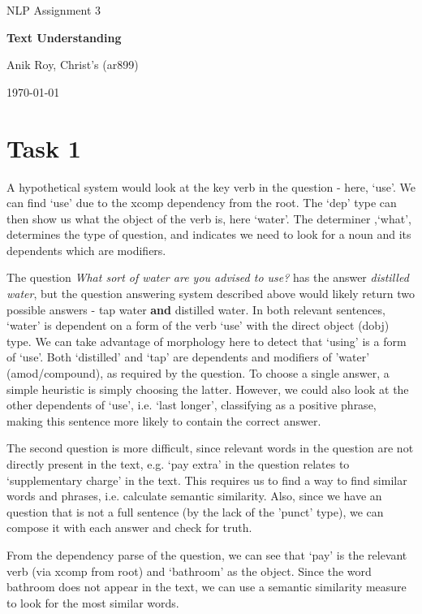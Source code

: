 \documentclass[12pt,a4paper]{article}
\begin{document}
\centerline{\large NLP Assignment 3}
\vspace{0.2in}
\centerline{\Large\bf Text Understanding}
\vspace{0.1in}
\centerline{\large {Anik Roy, Christ's (ar899)}}
\vspace{0.1in}
\centerline{\large {\today}}
\vspace{0.05in}


\section*{Task 1}


A hypothetical system would look at the key verb in the question - here, `use'. We can find `use' due to the xcomp dependency from the root. The `dep' type can then show us what the object of the verb is, here `water'. The determiner ,`what', determines the type of question, and indicates we need to look for a noun and its dependents which are modifiers.

The question \textit{What sort of water are you advised to use?} has the answer \textit{distilled water}, but the question answering system described above would likely return two possible answers - tap water \textbf{and} distilled water. In both relevant sentences, `water' is dependent on a form of the verb `use' with the direct object (dobj) type. We can take advantage of morphology \cite{NLP_lec2} here to detect that `using' is a form of `use'. Both `distilled' and `tap' are dependents and modifiers of 'water' (amod/compound), as required by the question. To choose a single answer, a simple heuristic is simply choosing the latter. However, we could also look at the other dependents of `use', i.e. `last longer', classifying as a positive phrase, making this sentence more likely to contain the correct answer. 

The second question is more difficult, since relevant words in the question are not directly present in the text, e.g. `pay extra' in the question relates to `supplementary charge' in the text. This requires us to find a way to find similar words and phrases, i.e. calculate semantic similarity. Also, since we have an question that is not a full sentence (by the lack of the 'punct' type), we can compose it with each answer and check for truth.

From the dependency parse of the question, we can see that `pay' is the relevant verb (via xcomp from root) and `bathroom' as the object. Since the word bathroom does not appear in the text, we can use a semantic similarity measure to look for the most similar words.
\end{document}
